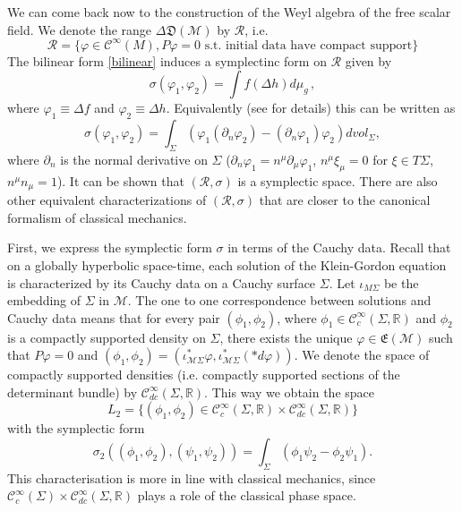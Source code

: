 \documentclass[12pt]{article}
\newcommand{\E}{\mathfrak{E}}
\newcommand{\D}{\mathfrak{D}}
\newcommand{\Mcal}{\mathcal{M}}
\newcommand{\Rcal}{\mathcal{R}}
\newcommand{\Ci}{\mathcal{C}^\infty} %
\newcommand{\RR}{\mathbb{R}}           %
\newcommand{\De}{\Delta}
\newcommand{\ph}{\varphi}
\newcommand{\1}{\mathds{1}}                         %
\begin{document}
{We can come back now to the construction of the Weyl algebra of the free scalar field. We denote the range
$\De\D(\Mcal)$ by $\mathcal{R}$, i.e.
\[
\Rcal=\{\ph \in \mathcal{C}^\infty(M), P\ph=0 \textrm{ s.t. initial data have compact support}\}
\]
The bilinear form \eqref{bilinear} induces a symplectinc form on $\Rcal$ given by
\[
\sigma(\ph_1,\ph_2)=\int f(\Delta h) d\mu_{g}\,,
\]
where $\ph_1\equiv \Delta f$ and $\ph_2\equiv \Delta h$. Equivalently (see \cite{Baer} for details) this can be written as
\[
\sigma(\ph_1,\ph_2) = \int_\Sigma  (\ph_1 (\partial_n \ph_2) - (\partial_n \ph_1)\ph_2)dvol_\Sigma,
\]
where $\partial_n$ is the normal derivative on $\Sigma$ ($\partial_n \ph_1 = n^{\mu} \partial_{\mu}\ph_1$, $n^{\mu} \xi_{\mu}=0 $ for $\xi \in T\Sigma$, $n^{\mu}n_{\mu}=1$). It can
be shown \cite{Dim} that $({\mathcal R},\sigma)$ is
a symplectic space. There are also other equivalent characterizations of $({\mathcal R},\sigma)$ that are closer to the canonical formalism of classical mechanics.

First, we express the symplectic form $\sigma$ in terms of the Cauchy data. Recall that on a globally hyperbolic space-time, each solution of the Klein-Gordon equation is characterized by its Cauchy data on a Cauchy surface $\Sigma$. Let $\iota_{M\Sigma}$ be the embedding of $\Sigma$ in $\Mcal$. The one to one correspondence between solutions and Cauchy data means that for every pair  $(\phi_1, \phi_2)$, where $\phi_1\in\Ci_c(\Sigma,\RR)$ and $\phi_2$ is a compactly supported density on $\Sigma$, there exists the unique $\ph\in\E(\Mcal)$ such that $P\ph=0$ and  $(\phi_1, \phi_2)=(\iota_{\Mcal\Sigma}^*\ph, \iota_{\Mcal\Sigma}^*(*d\ph))$. We denote the space of compactly supported densities (i.e. compactly supported sections of the determinant bundle) by $\Ci_{dc}(\Sigma,\RR)$. This way we obtain the space
\[
L_2 = \{ (\phi_1, \phi_2) \in \mathcal{C}_c^\infty(\Sigma,\RR) \times \mathcal{C}_{dc}^\infty(\Sigma,\RR) \}
\]
with the symplectic form
\[
\sigma_2((\phi_1, \phi_2), (\psi_1, \psi_2)) = \int_\Sigma (\phi_1 \psi_2 - \phi_2 \psi_1).
\] 
This characterisation is more in line with classical mechanics, since $ \mathcal{C}_c^\infty(\Sigma) \times   \mathcal{C}_{dc}^\infty(\Sigma,\RR)$ plays a role of the classical phase space. 
%

}
\end{document}
